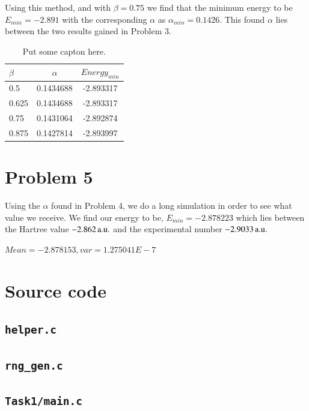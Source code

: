 Using this method, and with $\beta = 0.75$ we find that the minimum energy to be $E_{min}=-2.891$ with the corresponding $\alpha$ as $\alpha_{min}=0.1426$. This found $\alpha$ lies between the two results gained in Problem 3.

\begin{table}[H]
	\centering
	\caption{Put some capton here.}
	\begin{tabular}{|l|cc|}
		\hline $\beta$ & $\alpha$ & $Energy_{min}$ \\ \hline
		 0.5 & 0.1434688 & -2.893317 \\ \hline
		 0.625 & 0.1434688 & -2.893317 \\ \hline
		 0.75 & 0.1431064 & -2.892874 \\ \hline
		 0.875 & 0.1427814 & -2.893997 \\ \hline
	\end{tabular}
	\label{tab:prob5}
\end{table}


\section*{Problem 5}

Using the $\alpha$ found in Problem 4, we do a long simulation in order to see what value we receive. We find our energy to be, $E_{min}=-2.878223$ which lies between the Hartree value $\unit[-2.862]{a.u.}$ and the experimental number $\unit[-2.9033]{a.u.}$

$Mean = -2.878153, var = 1.275041E-7$






\appendix
\section{Source code}
\subsection{\texttt{helper.c}}


\subsection{\texttt{rng\_gen.c}}


\subsection{\texttt{Task1/main.c}}


